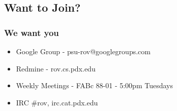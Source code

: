 \documentclass{beamer}
\begin{document}
\subsection{Want to Join?}
\frame
{
    \frametitle{We want you}

    \begin{itemize}
        \item Google Group - psu-rov@googlegroups.com
        \item Redmine - rov.cs.pdx.edu
        \item Weekly Meetings - FABc 88-01 - 5:00pm Tuesdays
        \item IRC \#rov, irc.cat.pdx.edu
    \end{itemize}
}
\end{document}
